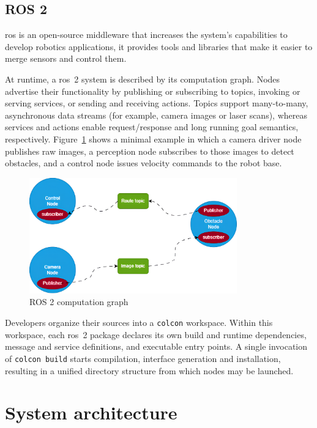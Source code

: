 \section{ROS 2}

\gls{ros} is an open-source middleware that increases the system's capabilities to develop robotics applications, it provides tools and libraries that make it easier to merge sensors and control them.

At runtime, a \gls{ros}~2 system is described by its computation graph. Nodes advertise their functionality by publishing or subscribing to topics, invoking or serving services, or sending and receiving actions. Topics support many-to-many, asynchronous data streams (for example, camera images or laser scans), whereas services and actions enable request/response and long running goal semantics, respectively. Figure~\ref{fig:comp-graph} shows a minimal example in which a camera driver node publishes raw images, a perception node subscribes to those images to detect obstacles, and a control node issues velocity commands to the robot base.

\begin{figure}[H]
  \centering
  \includegraphics[width=0.8\textwidth]{imgs/ros.png}
  \caption{ROS 2 computation graph}
  \label{fig:comp-graph}
\end{figure}

Developers organize their sources into a \texttt{colcon} workspace. Within this workspace, each \gls{ros}~2 package declares its own build and runtime dependencies, message and service definitions, and executable entry points. A single invocation of \texttt{colcon build} starts compilation, interface generation and installation, resulting in a unified directory structure from which nodes may be launched.

\chapter{System architecture}\label{chap:system_architecture}

